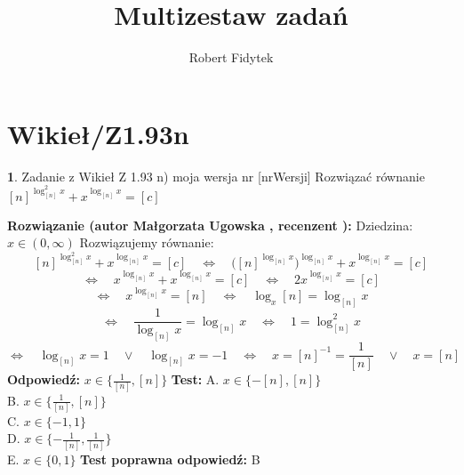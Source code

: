 \documentclass[12pt, a4paper]{article}
\title{Multizestaw zadań}
\author{Robert Fidytek}
\date{}
\theoremstyle{definition} %
\newtheorem{zad}{}
\newcommand{\kategoria}[1]{\section{#1}} %
\newcommand{\zadStart}[1]{\begin{zad}#1\newline} %
\newcommand{\zadStop}{\end{zad}}   %
\newcommand{\rozwStart}[2]{\noindent \textbf{Rozwiązanie (autor #1 , recenzent #2): }\newline} %
\newcommand{\rozwStop}{\newline}                                            %
\newcommand{\odpStart}{\noindent \textbf{Odpowiedź:}\newline}    %
\newcommand{\odpStop}{\newline}                                             %
\newcommand{\testStart}{\noindent \textbf{Test:}\newline} %
\newcommand{\testStop}{\newline} %
\newcommand{\kluczStart}{\noindent \textbf{Test poprawna odpowiedź:}\newline} %
\newcommand{\kluczStop}{\newline} %
\begin{document}
\maketitle


\kategoria{Wikieł/Z1.93n}
\zadStart{Zadanie z Wikieł Z 1.93 n) moja wersja nr [nrWersji]}
Rozwiązać równanie $[n]^{\log^2_{[n]}{x}}+ x^{\log_{[n]}{x}} = [c]$
\zadStop
\rozwStart{Małgorzata Ugowska}{}
Dziedzina: $x \in (0, \infty)$
Rozwiązujemy równanie:
$$ [n]^{\log^2_{[n]}{x}}+ x^{\log_{[n]}{x}} = [c] \quad \Longleftrightarrow \quad \Big([n]^{\log_{[n]}{x}}\Big)^{\log_{[n]}{x}}+ x^{\log_{[n]}{x}} = [c] $$
$$ \Longleftrightarrow \quad x^{\log_{[n]}{x}}+ x^{\log_{[n]}{x}} = [c] \quad \Longleftrightarrow \quad  2x^{\log_{[n]}{x}} = [c] $$
$$ \Longleftrightarrow \quad x^{\log_{[n]}{x}} = [n] \quad \Longleftrightarrow \quad \log_{x}{[n]}=\log_{[n]}{x}$$
$$ \Longleftrightarrow \quad \frac{1}{\log_{[n]}{x}} = \log_{[n]}{x} \quad \Longleftrightarrow \quad 1 = \log^2_{[n]}{x} $$
$$ \Longleftrightarrow \quad \log_{[n]}{x} = 1 \quad \vee \quad \log_{[n]}{x} = -1  \quad \Longleftrightarrow \quad x= [n]^{-1} = \frac{1}{[n]} \quad \vee \quad x = [n]$$
\rozwStop
\odpStart
$x \in \{\frac{1}{[n]} , [n] \}$
\odpStop
\testStart
A. $x \in \{-[n], [n] \}$\\
B. $x \in \{\frac{1}{[n]} , [n] \}$\\
C. $x \in \{-1, 1 \}$\\
D. $x \in \{-\frac{1}{[n]} , \frac{1}{[n]}  \}$\\
E. $x \in \{0, 1 \}$
\testStop
\kluczStart
B
\kluczStop
\end{document}
